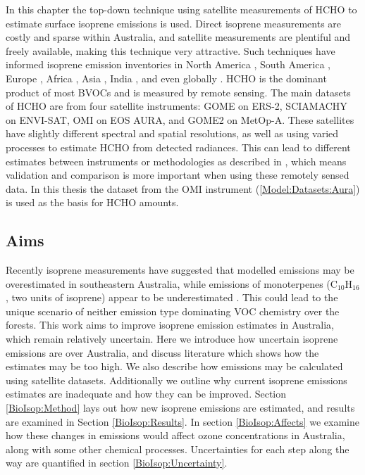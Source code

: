   In this chapter the top-down technique using satellite measurements of HCHO to estimate surface isoprene emissions is used.
  Direct isoprene measurements are costly and sparse within Australia, and satellite measurements are plentiful and freely available, making this technique very attractive.
  Such techniques have informed isoprene emission inventories in North America \parencite{Abbot2003,Palmer2003,Palmer2006,Millet2006,Millet2008}, South America \parencite{Barkley2013}, Europe \parencite{Dufour2009,Curci2010}, Africa \parencite{Marais2012}, Asia \parencite{Fu2007,Stavrakou2014}, India \parencite{Surl2018}, and even globally \parencite{Shim2005,FortemsCheiney2012,Bauwens2016}.
  HCHO is the dominant product of most BVOCs and is measured by remote sensing.
  The main datasets of HCHO are from four satellite instruments: GOME on ERS-2, SCIAMACHY on ENVI-SAT, OMI on EOS AURA, and GOME2 on MetOp-A.
  These satellites have slightly different spectral and spatial resolutions, as well as using varied processes to estimate HCHO from detected radiances.
  This can lead to different estimates between instruments or methodologies as described in \textcite{Lorente2017}, which means validation and comparison is more important when using these remotely sensed data.
  In this thesis the dataset from the OMI instrument (\ref{Model:Datasets:Aura}) is used as the basis for HCHO amounts.
  
  \subsection{Aims}
    
    Recently isoprene measurements have suggested that modelled emissions may be overestimated in southeastern Australia, while
    emissions of monoterpenes (C$_{10}$H$_{16}$, two units of isoprene) appear to be underestimated \parencite{Emmerson2016}. 
    This could lead to the unique scenario of neither emission type dominating VOC chemistry over the forests.
    This work aims to improve isoprene emission estimates in Australia, which remain relatively uncertain.
    Here we introduce how uncertain isoprene emissions are over Australia, and discuss literature which shows how the estimates may be too high.
    We also describe how emissions may be calculated using satellite datasets.
    Additionally we outline why current isoprene emissions estimates are inadequate and how they can be improved.
    Section \ref{BioIsop:Method} lays out how new isoprene emissions are estimated, and results are examined in Section \ref{BioIsop:Results}. 
    In section \ref{BioIsop:Affects} we examine how these changes in emissions would affect ozone concentrations in Australia, along with some other chemical processes.
    Uncertainties for each step along the way are quantified in section \ref{BioIsop:Uncertainty}.
  
